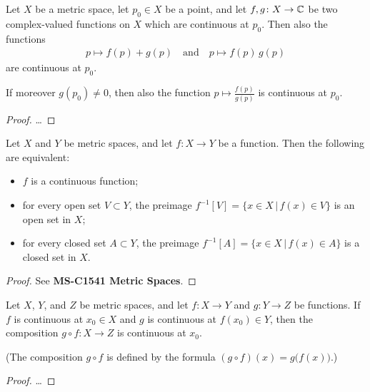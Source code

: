 \begin{lemma}
  \label{lem:complex_continuity_properties}
  Let $X$ be a metric space, let $p_0 \in X$
  be a point, and let $f,g \colon X \to \mathbb{C}$
  be two complex-valued functions on $X$
  which are continuous at $p_0$.
  Then also the functions
  \begin{align*}
    p \mapsto f(p) + g(p)
    \quad \text{and} \quad
    p \mapsto f(p) \, g(p)
  \end{align*}
  are continuous at $p_0$.

  If moreover $g(p_0) \ne 0$, then
  also the function
  $p \mapsto \frac{f(p)}{g(p)}$
  is continuous at $p_0$.
\end{lemma}
\begin{proof}
  \ldots
\end{proof}

\begin{lemma}
  \label{lem:continuity_characterization}
  Let $X$ and $Y$ be metric spaces, and let $f \colon X \to Y$ be a function.
  Then the following are equivalent:
  \begin{itemize}
    \item $f$ is a continuous function;
    \item for every open set $V \subset Y$, the preimage
      $f^{-1}[V] = \big\{ x \in X \, \big| \, f(x) \in V \big\}$
      is an open set in $X$;
    \item for every closed set $A \subset Y$, the preimage
      $f^{-1}[A] = \big\{ x \in X \, \big| \, f(x) \in A \big\}$
      is a closed set in $X$.
  \end{itemize}
\end{lemma}
\begin{proof}
  See \textbf{MS-C1541 Metric Spaces}.
\end{proof}

\begin{lemma}
  \label{lem:composition_continuous}
  Let $X$, $Y$, and $Z$ be metric spaces, and
  let $f \colon X \to Y$ and $g \colon Y \to Z$ be functions.
  If $f$ is continuous at $x_0 \in X$ and $g$ is continuous at $f(x_0) \in Y$,
  then the composition $g \circ f \colon X \to Z$ is continuous at $x_0$.

  (The composition $g \circ f$ is defined by
  the formula $(g \circ f)(x) = g \big( f(x) \big)$.)
\end{lemma}
\begin{proof}
  \ldots
\end{proof}

